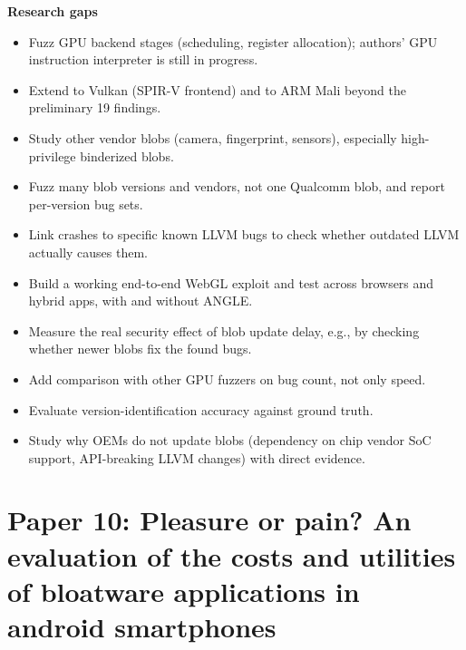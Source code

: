 \documentclass[11pt,a4paper]{article}
\begin{document}
\begin{enumerate}
    \vspace{4pt}
    \textbf{Research gaps}
    \begin{itemize}[leftmargin=*, itemsep=1pt, topsep=2pt]
        \item Fuzz GPU backend stages (scheduling, register allocation); authors' GPU instruction interpreter is still in progress.
        \item Extend to Vulkan (SPIR-V frontend) and to ARM Mali beyond the preliminary 19 findings.
        \item Study other vendor blobs (camera, fingerprint, sensors), especially high-privilege binderized blobs.
        \item Fuzz many blob versions and vendors, not one Qualcomm blob, and report per-version bug sets.
        \item Link crashes to specific known LLVM bugs to check whether outdated LLVM actually causes them.
        \item Build a working end-to-end WebGL exploit and test across browsers and hybrid apps, with and without ANGLE.
        \item Measure the real security effect of blob update delay, e.g., by checking whether newer blobs fix the found bugs.
        \item Add comparison with other GPU fuzzers on bug count, not only speed.
        \item Evaluate version-identification accuracy against ground truth.
        \item Study why OEMs do not update blobs (dependency on chip vendor SoC support, API-breaking LLVM changes) with direct evidence.
    \end{itemize}

\end{enumerate}

\newpage

\section{Paper 10: Pleasure or pain? An evaluation of the costs and utilities of bloatware applications in android smartphones}
\end{document}
